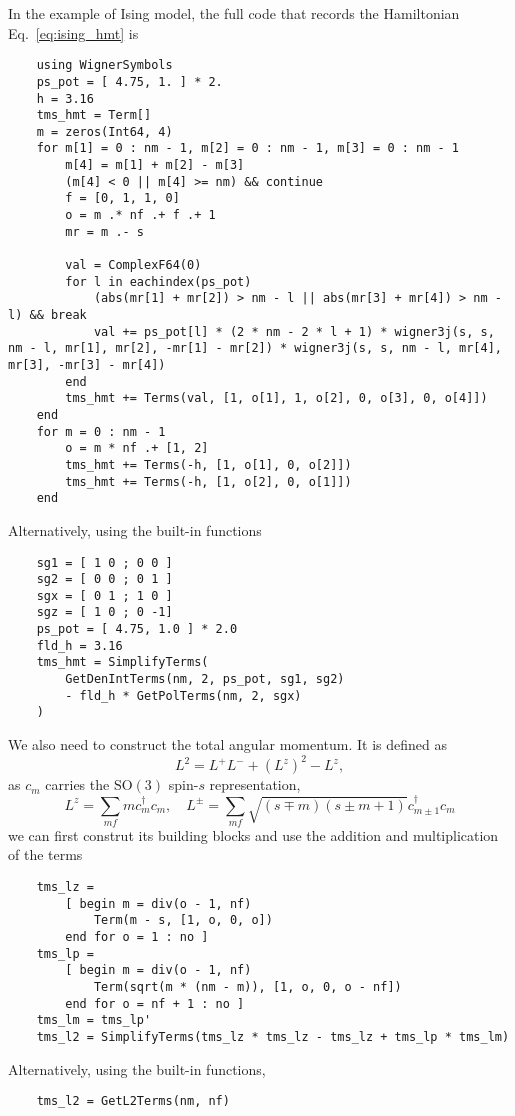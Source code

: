 \documentclass{timesjhep}
\begin{document}
In the example of Ising model, the full code that records the Hamiltonian Eq.~\eqref{eq:ising_hmt} is 
\begin{lstlisting}
    using WignerSymbols
    ps_pot = [ 4.75, 1. ] * 2.
    h = 3.16
    tms_hmt = Term[]
    m = zeros(Int64, 4)
    for m[1] = 0 : nm - 1, m[2] = 0 : nm - 1, m[3] = 0 : nm - 1
        m[4] = m[1] + m[2] - m[3]
        (m[4] < 0 || m[4] >= nm) && continue
        f = [0, 1, 1, 0]
        o = m .* nf .+ f .+ 1
        mr = m .- s
        
        val = ComplexF64(0)
        for l in eachindex(ps_pot)
            (abs(mr[1] + mr[2]) > nm - l || abs(mr[3] + mr[4]) > nm - l) && break 
            val += ps_pot[l] * (2 * nm - 2 * l + 1) * wigner3j(s, s, nm - l, mr[1], mr[2], -mr[1] - mr[2]) * wigner3j(s, s, nm - l, mr[4], mr[3], -mr[3] - mr[4])
        end 
        tms_hmt += Terms(val, [1, o[1], 1, o[2], 0, o[3], 0, o[4]])    
    end 
    for m = 0 : nm - 1
        o = m * nf .+ [1, 2]
        tms_hmt += Terms(-h, [1, o[1], 0, o[2]])
        tms_hmt += Terms(-h, [1, o[2], 0, o[1]])
    end
\end{lstlisting}
Alternatively, using the built-in functions
\begin{lstlisting}
    sg1 = [ 1 0 ; 0 0 ]
    sg2 = [ 0 0 ; 0 1 ]
    sgx = [ 0 1 ; 1 0 ]
    sgz = [ 1 0 ; 0 -1]
    ps_pot = [ 4.75, 1.0 ] * 2.0
    fld_h = 3.16
    tms_hmt = SimplifyTerms(
        GetDenIntTerms(nm, 2, ps_pot, sg1, sg2)
        - fld_h * GetPolTerms(nm, 2, sgx) 
    )
\end{lstlisting}

We also need to construct the total angular momentum. It is defined as 
\begin{equation}
    L^2=L^+L^-+(L^z)^2-L^z,
\end{equation}
as $c_m$ carries the $\mathrm{SO}(3)$ spin-$s$ representation, 
\begin{equation}
    L^z=\sum_{mf}mc_m^\dagger c_m,\quad L^\pm=\sum_{mf}\sqrt{(s\mp m)(s\pm m+1)}c^\dagger_{m\pm 1}c_m
\end{equation}
we can first construt its building blocks and use the addition and multiplication of the terms
\begin{lstlisting}
    tms_lz = 
        [ begin m = div(o - 1, nf)
            Term(m - s, [1, o, 0, o])
        end for o = 1 : no ]
    tms_lp = 
        [ begin m = div(o - 1, nf)
            Term(sqrt(m * (nm - m)), [1, o, 0, o - nf])
        end for o = nf + 1 : no ]
    tms_lm = tms_lp' 
    tms_l2 = SimplifyTerms(tms_lz * tms_lz - tms_lz + tms_lp * tms_lm)
\end{lstlisting}
Alternatively, using the built-in functions,
\begin{lstlisting}
    tms_l2 = GetL2Terms(nm, nf)
\end{lstlisting}
\end{document}
